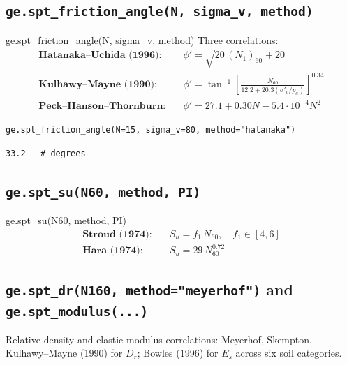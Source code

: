 \documentclass[11pt,a4paper,openany]{book}
\newcommand{\sigmavp}{\sigma'_v}
\begin{document}
\subsection{\texttt{ge.spt\_friction\_angle(N, sigma\_v, method)}}

\begin{funcbox}{ge.spt\_friction\_angle(N, sigma\_v, method)}
Three correlations:
\begin{align*}
\textbf{Hatanaka--Uchida (1996):} & \quad \phi' = \sqrt{20\,(N_1)_{60}} + 20 \\
\textbf{Kulhawy--Mayne (1990):}   & \quad \phi' = \tan^{-1}\!\left[
                                    \tfrac{N_{60}}{12.2 + 20.3(\sigmavp/p_a)}\right]^{0.34} \\
\textbf{Peck--Hanson--Thornburn:} & \quad \phi' = 27.1 + 0.30 N - 5.4\cdot10^{-4} N^2
\end{align*}
\end{funcbox}

\begin{lstlisting}
ge.spt_friction_angle(N=15, sigma_v=80, method="hatanaka")
\end{lstlisting}
\begin{lstlisting}[style=output]
33.2   # degrees
\end{lstlisting}

\subsection{\texttt{ge.spt\_su(N60, method, PI)}}

\begin{funcbox}{ge.spt\_su(N60, method, PI)}
\begin{align*}
\textbf{Stroud (1974):} & \quad S_u = f_1\,N_{60},\quad f_1 \in [4,6] \\
\textbf{Hara (1974):}   & \quad S_u = 29\,N_{60}^{0.72}
\end{align*}
\end{funcbox}

\subsection{\texttt{ge.spt\_dr(N160, method="meyerhof")} and \texttt{ge.spt\_modulus(...)}}

Relative density and elastic modulus correlations: Meyerhof,
Skempton, Kulhawy--Mayne (1990) for $D_r$; Bowles (1996) for $E_s$
across six soil categories.

\end{document}
